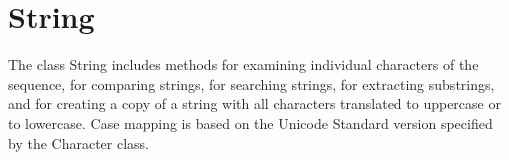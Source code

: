 \documentclass[main]{subfiles}
\begin{document}

\section{String}
\renewcommand{\arraystretch}{1.5}


The class String includes methods for examining individual characters of the sequence, for comparing strings, for searching strings, for extracting substrings, and for creating a copy of a string with all characters translated to uppercase or to lowercase. Case mapping is based on the Unicode Standard version specified by the Character class.
\end{document}
